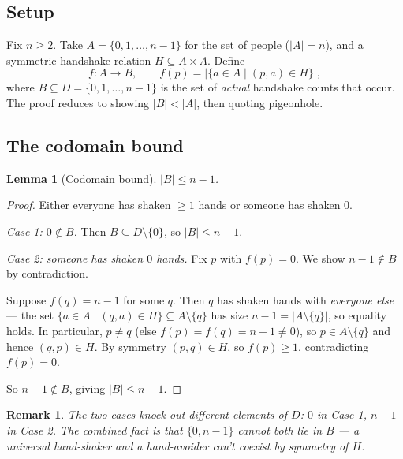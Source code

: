 \documentclass[11pt]{article}
\theoremstyle{defstyle}
\theoremstyle{thmstyle}
\newtheorem{lemma}[theorem]{Lemma}
\theoremstyle{notstyle}
\newtheorem*{remark}{Remark}
\theoremstyle{cautionstyle}
\newcommand{\card}[1]{\lvert #1 \rvert}
\begin{document}
\subsection*{Setup}

Fix $n \geq 2$.  Take $A = \{0, 1, \ldots, n-1\}$ for the set of people
($\card{A} = n$), and a symmetric handshake relation
$H \subseteq A \times A$.  Define
\[
  f \colon A \to B,\qquad f(p) = \bigl|\{a \in A \mid (p, a) \in H\}\bigr|,
\]
where $B \subseteq D = \{0, 1, \ldots, n-1\}$ is the set of \emph{actual}
handshake counts that occur.  The proof reduces to showing $\card{B} < \card{A}$,
then quoting pigeonhole.

\subsection*{The codomain bound}

\begin{thmbox}
\begin{lemma}[Codomain bound]
$\card{B} \leq n - 1$.
\end{lemma}
\begin{proof}
Either everyone has shaken $\geq 1$ hands or someone has shaken $0$.

\smallskip
\textit{Case 1: $0 \notin B$.}\;
Then $B \subseteq D \setminus \{0\}$, so $\card{B} \leq n - 1$.

\smallskip
\textit{Case 2: someone has shaken $0$ hands.}\;
Fix $p$ with $f(p) = 0$.  We show $n - 1 \notin B$ by contradiction.

Suppose $f(q) = n - 1$ for some $q$.  Then $q$ has shaken hands with
\emph{everyone else} --- the set
$\{a \in A \mid (q, a) \in H\} \subseteq A \setminus \{q\}$ has size
$n - 1 = \card{A \setminus \{q\}}$, so equality holds.  In particular,
$p \neq q$ (else $f(p) = f(q) = n - 1 \neq 0$), so $p \in A \setminus \{q\}$
and hence $(q, p) \in H$.  By symmetry $(p, q) \in H$, so
$f(p) \geq 1$, contradicting $f(p) = 0$.

So $n - 1 \notin B$, giving $\card{B} \leq n - 1$.
\end{proof}
\end{thmbox}

\begin{notebox}
\begin{remark}
The two cases knock out different elements of $D$: $0$ in Case 1,
$n - 1$ in Case 2.  The combined fact is that $\{0, n-1\}$ cannot both lie
in $B$ --- a universal hand-shaker and a hand-avoider can't coexist by
symmetry of $H$.
\end{remark}
\end{notebox}
\end{document}
